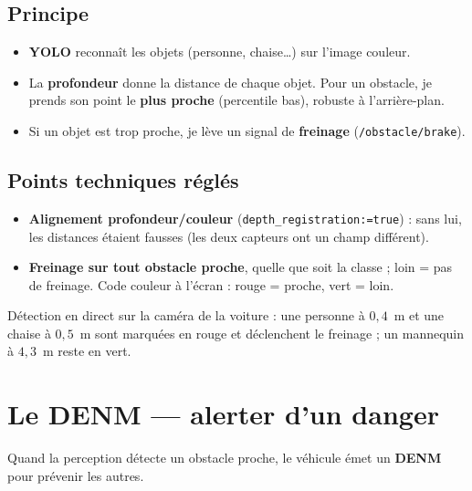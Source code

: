 \documentclass[a4paper,11pt]{article}
\newcommand{\code}[1]{\texttt{#1}}
\begin{document}
\subsection{Principe}
\begin{itemize}[leftmargin=1.6em]
  \item \textbf{YOLO} reconnaît les objets (personne, chaise\ldots) sur l'image couleur.
  \item La \textbf{profondeur} donne la distance de chaque objet. Pour un obstacle, je
        prends son point le \textbf{plus proche} (percentile bas), robuste à l'arrière-plan.
  \item Si un objet est trop proche, je lève un signal de \textbf{freinage}
        (\code{/obstacle/brake}).
\end{itemize}

\subsection{Points techniques réglés}
\begin{itemize}[leftmargin=1.6em]
  \item \textbf{Alignement profondeur/couleur} (\code{depth\_registration:=true}) : sans lui,
        les distances étaient fausses (les deux capteurs ont un champ différent).
  \item \textbf{Freinage sur tout obstacle proche}, quelle que soit la classe ; loin = pas de
        freinage. Code couleur à l'écran : rouge = proche, vert = loin.
\end{itemize}

\begin{note}[Vérifié]
Détection en direct sur la caméra de la voiture : une personne à $0{,}4$~m et une chaise
à $0{,}5$~m sont marquées en rouge et déclenchent le freinage ; un mannequin à $4{,}3$~m
reste en vert.
\end{note}

\section{Le DENM --- alerter d'un danger}
Quand la perception détecte un obstacle proche, le véhicule émet un \textbf{DENM} pour
prévenir les autres.
\end{document}
